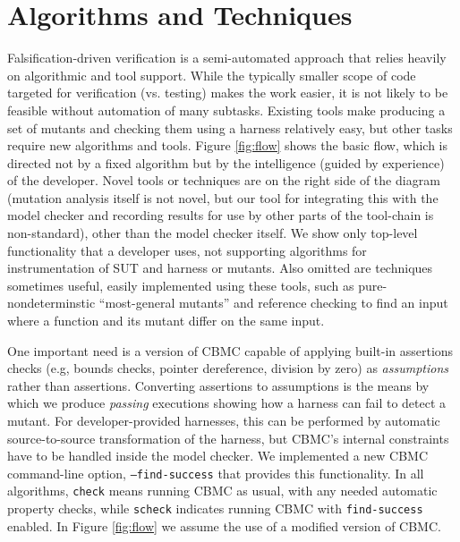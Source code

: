 \documentclass[conference]{IEEEtran}
\begin{document}
\section{Algorithms and Techniques}
\label{sec:algs}

Falsification-driven verification is a semi-automated approach that
relies heavily on algorithmic and tool support.  While the typically
smaller scope of code targeted for verification (vs. testing) makes the work easier,
it is not likely to be feasible without automation of many
subtasks. Existing tools make producing a set of mutants and checking
them using a harness relatively easy, but other tasks require new algorithms
and tools.  Figure \ref{fig:flow} shows the basic flow, which is directed
not by a fixed algorithm but by the intelligence (guided by experience)
\cite{NeroWolfe} of the
developer.  Novel tools or techniques are on the right side of the
diagram (mutation analysis itself is not novel, but our tool for integrating
this with the model checker and recording results for use by other
parts of the tool-chain is non-standard), other than the model checker
itself. We show only top-level functionality that a developer uses,
not supporting algorithms for instrumentation of SUT and harness
or mutants.  Also omitted are techniques sometimes useful, easily
implemented using these tools, such as pure-nondeterminstic
``most-general mutants'' and reference checking to find an input where
a function and its mutant differ on the same input.

One important need is a version of CBMC capable of applying built-in
assertions checks (e.g, bounds checks, pointer dereference, division by
zero) as \emph{assumptions} rather than assertions.  Converting
assertions to assumptions is the means by which we produce
\emph{passing} executions showing how a harness can fail to detect a
mutant.  For developer-provided harnesses, this can be performed by
automatic source-to-source transformation of the harness, but CBMC's
internal constraints have to be handled inside the model checker.  We
implemented a new CBMC command-line option, {\tt --find-success} that
provides this functionality.  In all algorithms, {\tt check} means
running CBMC as usual, with any needed automatic property
checks, while {\tt scheck} indicates running CBMC with
{\tt find-success} enabled.  In Figure \ref{fig:flow} we assume the
use of a modified version of CBMC.
\end{document}
